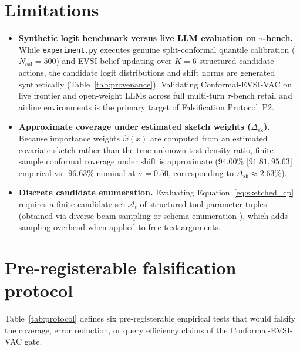 \documentclass[11pt]{article}
\begin{document}
\section{Limitations}\label{sec:limits}

\begin{itemize}
  \item \textbf{Synthetic logit benchmark versus live LLM evaluation on $\tau$-bench.} While \texttt{experiment.\linebreak[0]py} executes genuine split-conformal quantile calibration ($N_{\mathrm{cal}}=500$) and EVSI belief updating over $K=6$ structured candidate actions, the candidate logit distributions and shift norms are generated synthetically (Table~\ref{tab:provenance}). Validating Conformal-EVSI-VAC on live frontier and open-weight LLMs across full multi-turn $\tau$-bench retail and airline environments \citep{yao2024taubench} is the primary target of Falsification Protocol~P2.
  \item \textbf{Approximate coverage under estimated sketch weights ($\Delta_{\mathrm{sk}}$).} Because importance weights $\hat{w}(x)$ are computed from an estimated covariate sketch rather than the true unknown test density ratio, finite-sample conformal coverage under shift is approximate ($94.00\%$ [$91.81, 95.63$] empirical vs.\ $96.63\%$ nominal at $\sigma=0.50$, corresponding to $\Delta_{\mathrm{sk}} \approx 2.63\%$).
  \item \textbf{Discrete candidate enumeration.} Evaluating Equation~\eqref{eq:sketched_cp} requires a finite candidate set $\mathcal{A}_t$ of structured tool parameter tuples (obtained via diverse beam sampling or schema enumeration \citep{ren2023knowno, kuhn2023clam}), which adds sampling overhead when applied to free-text arguments.
\end{itemize}

\section{Pre-registerable falsification protocol}\label{sec:protocol}

Table~\ref{tab:protocol} defines six pre-registerable empirical tests that would falsify the coverage, error reduction, or query efficiency claims of the Conformal-EVSI-VAC gate.
\end{document}
